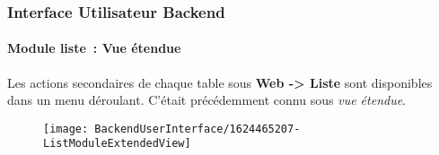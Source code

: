 %

\begin{frame}[fragile]
	\frametitle{Interface Utilisateur Backend}
	\framesubtitle{Module liste~: Vue étendue}

	Les actions secondaires de chaque table sous \textbf{Web -> Liste} sont disponibles
	dans un menu déroulant. C'était précédemment connu sous \textit{vue étendue}.

	\begin{figure}
		\texttt{[image: BackendUserInterface/1624465207-ListModuleExtendedView]}
	\end{figure}

\end{frame}

